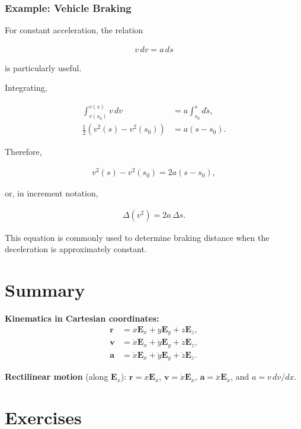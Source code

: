 \documentclass[
  letterpaper,
  DIV=11,
  numbers=noendperiod]{scrreprt}
\begin{document}
\subsubsection{Example: Vehicle Braking}\label{example-vehicle-braking}

For constant acceleration, the relation

\begin{align*}
v\,dv=a\,ds
\end{align*}

is particularly useful.

Integrating,

\begin{align*}
\int_{v(s_0)}^{v(s)} v\,dv
&=
a\int_{s_0}^{s} d\tilde{s},\\
\frac{1}{2}\left(v^2(s)-v^2(s_0)\right)
&=
a(s-s_0).
\end{align*}

Therefore,

\begin{align*}
v^2(s)-v^2(s_0)
=
2a(s-s_0),
\end{align*}

or, in increment notation,

\begin{align*}
\Delta(v^2)=2a\,\Delta s.
\end{align*}

This equation is commonly used to determine braking distance when the
deceleration is approximately constant.

\section{Summary}\label{summary-1}

\textbf{Kinematics in Cartesian coordinates:} \begin{align}
    \mathbf{r} &= x\mathbf{E}_x + y\mathbf{E}_y + z\mathbf{E}_z, \\
    \mathbf{v} &= \dot{x}\mathbf{E}_x + \dot{y}\mathbf{E}_y + \dot{z}\mathbf{E}_z, \\
    \mathbf{a} &= \ddot{x}\mathbf{E}_x + \ddot{y}\mathbf{E}_y + \ddot{z}\mathbf{E}_z.
\end{align}

\textbf{Rectilinear motion} (along \(\mathbf{E}_x\)):
\(\mathbf{r}=x\mathbf{E}_x\), \(\mathbf{v}=\dot{x}\mathbf{E}_x\),
\(\mathbf{a}=\ddot{x}\mathbf{E}_x\), and \(a = v\,dv/dx\).

\section{Exercises}\label{exercises-3}
\end{document}
